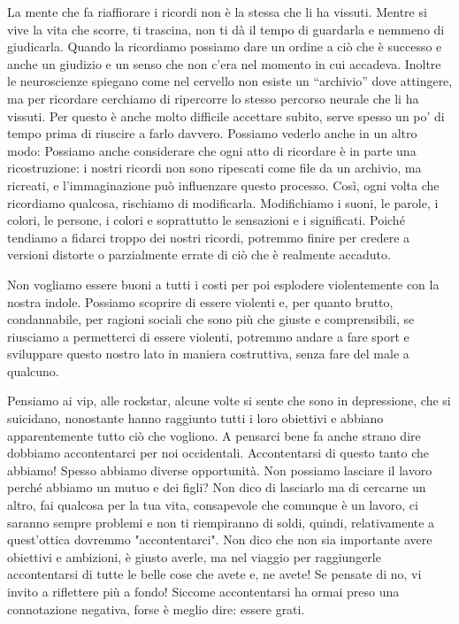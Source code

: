 \documentclass[12pt]{book} %
\begin{document}
La mente che fa riaffiorare i ricordi non è la stessa che li ha vissuti. 
Mentre si vive la vita che scorre, ti trascina, non ti dà il tempo di guardarla e nemmeno di
giudicarla. Quando la ricordiamo possiamo dare un ordine a ciò che è successo e anche un giudizio e un senso che non
c'era nel momento in cui accadeva. Inoltre le neuroscienze spiegano come nel cervello non esiste
un “archivio” dove attingere, ma per ricordare cerchiamo di ripercorre lo stesso percorso neurale che li ha vissuti.
Per questo è anche molto difficile accettare subito, serve spesso un po' di tempo prima di
riuscire a farlo davvero. Possiamo vederlo anche in un altro modo: Possiamo anche considerare che ogni atto di ricordare è in parte una ricostruzione: i nostri ricordi non sono ripescati come file da un archivio, ma ricreati, e l’immaginazione può influenzare questo processo. Così, ogni volta che ricordiamo qualcosa, rischiamo di modificarla. Modifichiamo i suoni, le
parole, i colori, le persone, i colori e soprattutto le sensazioni e i significati. Poiché tendiamo a fidarci troppo dei nostri ricordi, potremmo finire per credere a versioni distorte o parzialmente errate di ciò che è realmente accaduto.

Non vogliamo essere buoni a tutti i costi per poi esplodere violentemente con la nostra indole.
Possiamo scoprire di essere violenti e, per quanto brutto, condannabile, per ragioni sociali che sono più che giuste e
comprensibili, se riusciamo a permetterci di essere violenti, potremmo andare a fare sport e sviluppare questo nostro lato in maniera costruttiva, senza fare del male a qualcuno.

Pensiamo ai vip, alle rockstar, alcune volte si sente che sono in depressione, che si suicidano, nonostante hanno
raggiunto tutti i loro obiettivi e abbiano apparentemente tutto ciò che vogliono. A pensarci bene fa anche strano dire dobbiamo accontentarci per noi
occidentali. Accontentarsi di questo tanto che abbiamo!
Spesso abbiamo diverse opportunità. Non possiamo lasciare il lavoro perché abbiamo un mutuo e dei figli? Non dico di
lasciarlo ma di cercarne un altro, fai qualcosa per la tua vita, consapevole che comunque è un lavoro, ci saranno
sempre problemi e non ti riempiranno di soldi, quindi, relativamente a quest'ottica dovremmo "accontentarci". Non dico che non sia importante avere obiettivi e ambizioni, è giusto averle, ma nel viaggio per
raggiungerle accontentarsi di tutte le belle cose che avete e, ne avete! Se pensate di no, vi invito a riflettere più a fondo! Siccome accontentarsi ha ormai preso una connotazione negativa, forse è meglio dire: essere grati.
\end{document}
